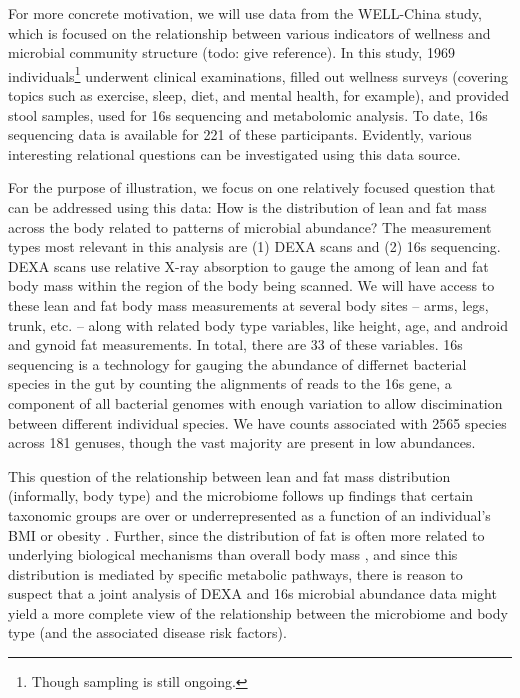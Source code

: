 \documentclass{article}
\begin{document}
For more concrete motivation, we will use data from the WELL-China study, which
is focused on the relationship between various indicators of wellness and
microbial community structure (todo: give reference). In this study, 1969
individuals\footnote{Though sampling is still ongoing.} underwent clinical
examinations, filled out wellness surveys (covering topics such as exercise,
sleep, diet, and mental health, for example), and provided stool samples, used
for 16s sequencing and metabolomic analysis. To date, 16s sequencing data is
available for 221 of these participants. Evidently, various interesting
relational questions can be investigated using this data source.

For the purpose of illustration, we focus on one relatively focused question
that can be addressed using this data: How is the distribution of lean and fat
mass across the body related to patterns of microbial abundance? The measurement
types most relevant in this analysis are (1) DEXA scans and (2) 16s sequencing.
DEXA scans use relative X-ray absorption to gauge the among of lean and fat body
mass within the region of the body being scanned. We will have access to these
lean and fat body mass measurements at several body sites -- arms, legs, trunk,
etc. -- along with related body type variables, like height, age, and android
and gynoid fat measurements. In total, there are 33 of these variables. 16s
sequencing is a technology for gauging the abundance of differnet bacterial
species in the gut by counting the alignments of reads to the 16s gene, a
component of all bacterial genomes with enough variation to allow discimination
between different individual species. We have counts associated with 2565
species across 181 genuses, though the vast majority are present in low
abundances.

This question of the relationship between lean and fat mass distribution
(informally, body type) and the microbiome follows up findings that certain
taxonomic groups are over or underrepresented as a function of an individual's
BMI or obesity \citep{ley2006microbial, turnbaugh2009core, ley2005obesity,
  ley2010obesity}. Further, since the distribution of fat is often more related
to underlying biological mechanisms than overall body mass
\citep{matsuzawa2008role}, and since this distribution is mediated by specific
metabolic pathways, there is reason to suspect that a joint analysis of DEXA and
16s microbial abundance data might yield a more complete view of the
relationship between the microbiome and body type (and the associated disease
risk factors).
\end{document}
